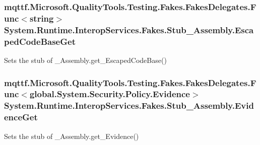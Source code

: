 \hypertarget{class_system_1_1_runtime_1_1_interop_services_1_1_fakes_1_1_stub___assembly_aec7d6e88b7f3f94ed5d7e9058440b948}{
\subsubsection[{Escaped\-Code\-Base\-Get}]{\setlength{\rightskip}{0pt plus 5cm}mqttf.\-Microsoft.\-Quality\-Tools.\-Testing.\-Fakes.\-Fakes\-Delegates.\-Func$<$string$>$ System.\-Runtime.\-Interop\-Services.\-Fakes.\-Stub\-\_\-\-Assembly.\-Escaped\-Code\-Base\-Get}}\label{class_system_1_1_runtime_1_1_interop_services_1_1_fakes_1_1_stub___assembly_aec7d6e88b7f3f94ed5d7e9058440b948}


Sets the stub of \-\_\-\-Assembly.\-get\-\_\-\-Escaped\-Code\-Base()

\hypertarget{class_system_1_1_runtime_1_1_interop_services_1_1_fakes_1_1_stub___assembly_a2076b2d2b01d807c8752a075206237cd}{
\subsubsection[{Evidence\-Get}]{\setlength{\rightskip}{0pt plus 5cm}mqttf.\-Microsoft.\-Quality\-Tools.\-Testing.\-Fakes.\-Fakes\-Delegates.\-Func$<$global.\-System.\-Security.\-Policy.\-Evidence$>$ System.\-Runtime.\-Interop\-Services.\-Fakes.\-Stub\-\_\-\-Assembly.\-Evidence\-Get}}\label{class_system_1_1_runtime_1_1_interop_services_1_1_fakes_1_1_stub___assembly_a2076b2d2b01d807c8752a075206237cd}


Sets the stub of \-\_\-\-Assembly.\-get\-\_\-\-Evidence()

